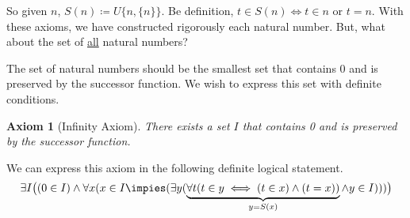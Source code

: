 \documentclass[11pt]{article}
\theoremstyle{theorem}
\newtheorem{axiom}[theorem]{Axiom}
\begin{document}
\begin{titlepage}
So given $n$, $S(n) \coloneqq U\{n,\{n\}\}$. Be definition, $t \in S(n) \iff t
\in n$ or $t = n$. With these axioms, we have constructed rigorously each
natural number. But, what about the set of \underline{all} natural numbers? 

The set of natural numbers should be the smallest set that contains 0 and is
preserved by the successor function. We wish to express this set with definite
conditions.

\begin{axiom}[Infinity Axiom]
	There exists a set $I$ that contains 0 and is preserved by the successor
	function.
\end{axiom}
We can express this axiom in the following definite logical statement.
\begin{equation*}
	\exists I \big((0 \in I) \wedge \forall x (x \in I \impies (\exists y
	(\underbrace{\forall t (t \in y \iff (t \in x) \wedge (t = x))}_{y = S(x)}
	\wedge y \in I))) \big)
\end{equation*}


\end{titlepage}
\end{document}
